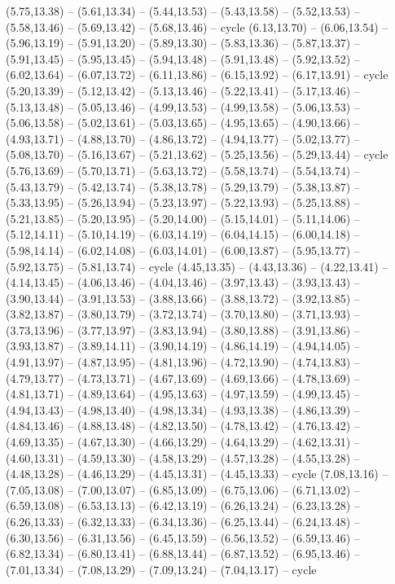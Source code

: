 \expandafter\def\csname geo:gebiet:DNK\endcsname{
  (5.75,13.38) -- (5.61,13.34) -- (5.44,13.53) -- (5.43,13.58) -- (5.52,13.53) -- (5.58,13.46) -- (5.69,13.42) -- (5.68,13.46) -- cycle
  (6.13,13.70) -- (6.06,13.54) -- (5.96,13.19) -- (5.91,13.20) -- (5.89,13.30) -- (5.83,13.36) -- (5.87,13.37) -- (5.91,13.45) -- (5.95,13.45) -- (5.94,13.48) -- (5.91,13.48) -- (5.92,13.52) -- (6.02,13.64) -- (6.07,13.72) -- (6.11,13.86) -- (6.15,13.92) -- (6.17,13.91) -- cycle
  (5.20,13.39) -- (5.12,13.42) -- (5.13,13.46) -- (5.22,13.41) -- (5.17,13.46) -- (5.13,13.48) -- (5.05,13.46) -- (4.99,13.53) -- (4.99,13.58) -- (5.06,13.53) -- (5.06,13.58) -- (5.02,13.61) -- (5.03,13.65) -- (4.95,13.65) -- (4.90,13.66) -- (4.93,13.71) -- (4.88,13.70) -- (4.86,13.72) -- (4.94,13.77) -- (5.02,13.77) -- (5.08,13.70) -- (5.16,13.67) -- (5.21,13.62) -- (5.25,13.56) -- (5.29,13.44) -- cycle
  (5.76,13.69) -- (5.70,13.71) -- (5.63,13.72) -- (5.58,13.74) -- (5.54,13.74) -- (5.43,13.79) -- (5.42,13.74) -- (5.38,13.78) -- (5.29,13.79) -- (5.38,13.87) -- (5.33,13.95) -- (5.26,13.94) -- (5.23,13.97) -- (5.22,13.93) -- (5.25,13.88) -- (5.21,13.85) -- (5.20,13.95) -- (5.20,14.00) -- (5.15,14.01) -- (5.11,14.06) -- (5.12,14.11) -- (5.10,14.19) -- (6.03,14.19) -- (6.04,14.15) -- (6.00,14.18) -- (5.98,14.14) -- (6.02,14.08) -- (6.03,14.01) -- (6.00,13.87) -- (5.95,13.77) -- (5.92,13.75) -- (5.81,13.74) -- cycle
  (4.45,13.35) -- (4.43,13.36) -- (4.22,13.41) -- (4.14,13.45) -- (4.06,13.46) -- (4.04,13.46) -- (3.97,13.43) -- (3.93,13.43) -- (3.90,13.44) -- (3.91,13.53) -- (3.88,13.66) -- (3.88,13.72) -- (3.92,13.85) -- (3.82,13.87) -- (3.80,13.79) -- (3.72,13.74) -- (3.70,13.80) -- (3.71,13.93) -- (3.73,13.96) -- (3.77,13.97) -- (3.83,13.94) -- (3.80,13.88) -- (3.91,13.86) -- (3.93,13.87) -- (3.89,14.11) -- (3.90,14.19) -- (4.86,14.19) -- (4.94,14.05) -- (4.91,13.97) -- (4.87,13.95) -- (4.81,13.96) -- (4.72,13.90) -- (4.74,13.83) -- (4.79,13.77) -- (4.73,13.71) -- (4.67,13.69) -- (4.69,13.66) -- (4.78,13.69) -- (4.81,13.71) -- (4.89,13.64) -- (4.95,13.63) -- (4.97,13.59) -- (4.99,13.45) -- (4.94,13.43) -- (4.98,13.40) -- (4.98,13.34) -- (4.93,13.38) -- (4.86,13.39) -- (4.84,13.46) -- (4.88,13.48) -- (4.82,13.50) -- (4.78,13.42) -- (4.76,13.42) -- (4.69,13.35) -- (4.67,13.30) -- (4.66,13.29) -- (4.64,13.29) -- (4.62,13.31) -- (4.60,13.31) -- (4.59,13.30) -- (4.58,13.29) -- (4.57,13.28) -- (4.55,13.28) -- (4.48,13.28) -- (4.46,13.29) -- (4.45,13.31) -- (4.45,13.33) -- cycle
  (7.08,13.16) -- (7.05,13.08) -- (7.00,13.07) -- (6.85,13.09) -- (6.75,13.06) -- (6.71,13.02) -- (6.59,13.08) -- (6.53,13.13) -- (6.42,13.19) -- (6.26,13.24) -- (6.23,13.28) -- (6.26,13.33) -- (6.32,13.33) -- (6.34,13.36) -- (6.25,13.44) -- (6.24,13.48) -- (6.30,13.56) -- (6.31,13.56) -- (6.45,13.59) -- (6.56,13.52) -- (6.59,13.46) -- (6.82,13.34) -- (6.80,13.41) -- (6.88,13.44) -- (6.87,13.52) -- (6.95,13.46) -- (7.01,13.34) -- (7.08,13.29) -- (7.09,13.24) -- (7.04,13.17) -- cycle
}
